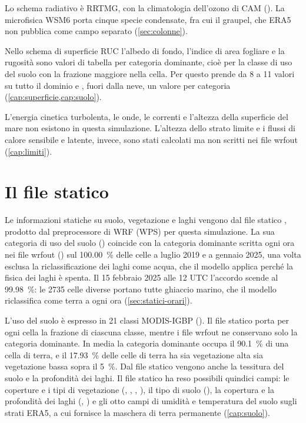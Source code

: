 Lo schema radiativo è RRTMG, con la climatologia dell'ozono di CAM (). La
microfisica WSM6 porta cinque specie condensate, fra cui il graupel, che ERA5 non pubblica come
campo separato (\cref{sec:colonne}).

Nello schema di superficie RUC l'albedo di fondo, l'indice di area fogliare e la rugosità sono
valori di tabella per categoria dominante, cioè per la classe di uso del suolo con la frazione
maggiore nella cella. Per questo  prende da 8 a 11 valori su tutto il dominio e
, fuori dalla neve, un valore per categoria (\cref{cap:superficie,cap:suolo}).

L'energia cinetica turbolenta, le onde, le correnti e l'altezza della superficie del mare non
esistono in questa simulazione. L'altezza dello strato limite e i flussi di calore sensibile e
latente, invece, sono stati calcolati ma non scritti nei file wrfout (\cref{cap:limiti}).

\section{Il file statico}
\label{sec:file-statico}

Le informazioni statiche su suolo, vegetazione e laghi vengono dal file statico
, prodotto dal preprocessore di WRF (WPS) per questa simulazione. La sua
categoria di uso del suolo () coincide con la categoria dominante scritta ogni ora
nei file wrfout () sul \SI{100.00}{\percent} delle celle a luglio 2019 e a gennaio
2025, una volta esclusa la riclassificazione dei laghi come acqua, che il modello applica perché
la fisica dei laghi è spenta. Il 15 febbraio 2025 alle 12 UTC l'accordo scende al
\SI{99.98}{\percent}: le \num{2735} celle diverse portano tutte ghiaccio marino, che il modello
riclassifica come terra a ogni ora (\cref{sec:statici-orari}).

L'uso del suolo è espresso in 21 classi MODIS-IGBP (). Il
file statico porta per ogni cella la frazione di ciascuna classe, mentre i file wrfout ne
conservano solo la categoria dominante. In media la categoria dominante occupa il
\SI{90.1}{\percent} di una cella di terra, e il \SI{17.93}{\percent} delle celle di terra ha sia
vegetazione alta sia vegetazione bassa sopra il \SI{5}{\percent}. Dal file statico vengono anche la
tessitura del suolo e la profondità dei laghi. Il file statico ha reso possibili quindici campi:
le coperture e i tipi di vegetazione (, , , ), il tipo
di suolo (), la copertura e la profondità dei laghi (, ) e gli otto
campi di umidità e temperatura del suolo sugli strati ERA5, a cui fornisce la maschera di terra
permanente (\cref{cap:suolo}).
